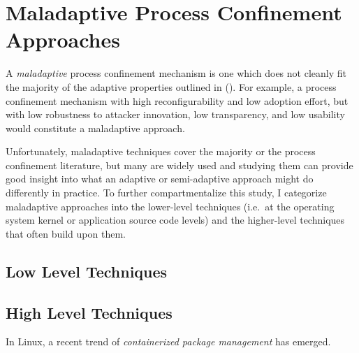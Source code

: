 \documentclass[dvipsnames, 12pt]{article}
\begin{document}
\section{Maladaptive Process Confinement Approaches}
\label{sec:maladaptive}

A \textit{maladaptive} process confinement mechanism is one which does not
cleanly fit the majority of the adaptive properties outlined in
 (). For example, a process
confinement mechanism with high reconfigurability and low adoption effort, but
with low robustness to attacker innovation, low transparency, and low usability
would constitute a maladaptive approach.

Unfortunately, maladaptive techniques cover the majority or the process
confinement literature, but many are widely used and studying them can provide
good insight into what an adaptive or semi-adaptive approach might do
differently in practice. To further compartmentalize this study, I categorize
maladaptive approaches into the lower-level techniques (i.e.~at the operating
system kernel or application source code levels) and the higher-level techniques
that often build upon them.

\subsection{Low Level Techniques}



\subsection{High Level Techniques}

In Linux, a recent trend of \textit{containerized package management} has emerged.
\end{document}
